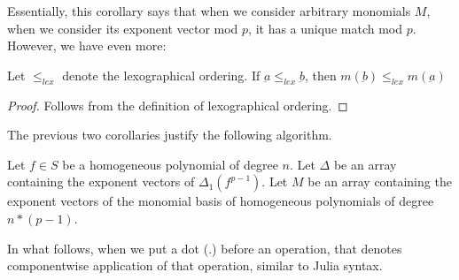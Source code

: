 Essentially, this corollary says that
when we consider arbitrary monomials \(M\),
when we consider its exponent vector 
mod \(p\), it has a unique
match mod \(p\).
However, we have even more:

\begin{cor}
	\label{cor:match:order}
	Let \(\leq_{lex}\) denote the 
	lexographical ordering.
	If \(\underbar{a} \leq_{lex} \underbar{b}\),
	then 
	\(m(\underbar{b}) \leq_{lex} m(\underbar{a})\)
\end{cor}

\begin{proof}
	Follows from the definition of lexographical
	ordering.
\end{proof}

The previous two corollaries justify
the following algorithm.

\begin{cxt}
	Let \(f \in S\) be a homogeneous
	polynomial of degree \(n\).
	Let \(\Delta\) be an array containing the 
	exponent vectors of \(\Delta_{1}(f^{p-1})\).
	Let \(M\) be an array containing the exponent
	vectors of the monomial basis of
	homogeneous polynomials of degree
	\(n*(p-1)\).
\end{cxt}

In what follows, when we put a dot (\(.\))
before an operation, that denotes
componentwise application
of that operation, similar to Julia syntax.

